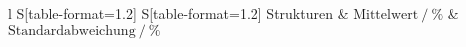 \begin{table}
    \centering
    \caption{Vergleich der Mittelwerte und Standardabweichungen.}
    \label{table:A11}
    \begin{tabular}{
	l
	S[table-format=1.2]
	S[table-format=1.2]
	}
	\toprule
	{Strukturen}		& {$\text{Mittelwert}\:/\: \si{\percent}$}		& 
	{$\text{Standardabweichung}\:/\: \si{\percent}$}		\\ 
	\midrule
    
    \bottomrule
    \end{tabular}
    \end{table}
